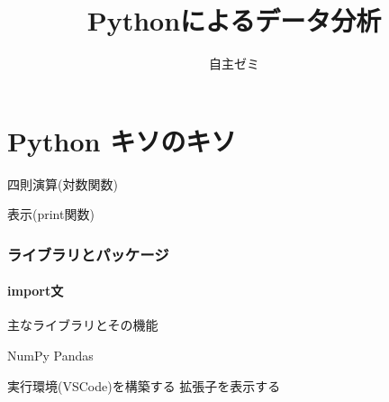 \documentclass[dvipdfmx, leqno]{jsreport}
\title{Pythonによるデータ分析}
\author{}
\date{自主ゼミ}
\begin{document}
\maketitle
\tableofcontents


\part{Python キソのキソ}
四則演算(対数関数)


表示(print関数)









\section{ライブラリとパッケージ}
\subsection{import文}
    主なライブラリとその機能

    NumPy
    Pandas




    実行環境(VSCode)を構築する
    拡張子を表示する
\end{document}
